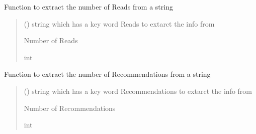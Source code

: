 \documentclass[letterpaper,10pt,english]{sphinxmanual}
\begin{document}
\begin{fulllineitems}
\label{\detokenize{auxilary_functions:auxilary_functions.reads}}
\pysigstartsignatures
{}
\pysigstopsignatures
\sphinxAtStartPar
Function to extract the number of Reads from a string
\begin{quote}\begin{description}
\sphinxAtStartPar
{} () \textendash{} string which has a key word \sphinxhyphen{} Reads to extarct the info from

\sphinxAtStartPar
Number of Reads

\sphinxAtStartPar
int

\end{description}\end{quote}

\end{fulllineitems}


\begin{fulllineitems}
\label{\detokenize{auxilary_functions:auxilary_functions.recommendations}}
\pysigstartsignatures
{}
\pysigstopsignatures
\sphinxAtStartPar
Function to extract the number of Recommendations from a string
\begin{quote}\begin{description}
\sphinxAtStartPar
{} () \textendash{} string which has a key word \sphinxhyphen{} Recommendations to extarct the info from

\sphinxAtStartPar
Number of Recommendations

\sphinxAtStartPar
int

\end{description}\end{quote}

\end{fulllineitems}
\end{document}
